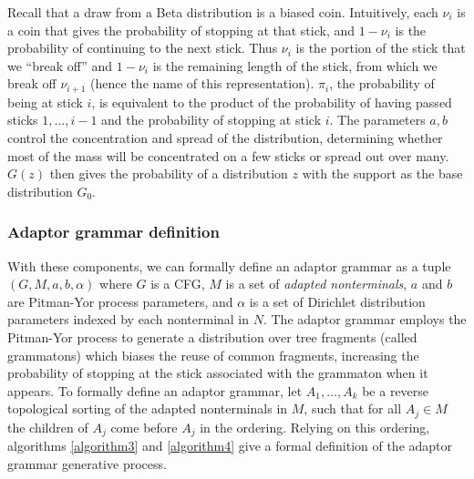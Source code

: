 \documentclass[12pt,letterpaper]{article}
\begin{document}
Recall that a draw from a Beta distribution is a biased coin. Intuitively, each $\nu_i$ is a coin that gives the probability of stopping at that stick, and $1-\nu_i$ is the probability of continuing to the next stick. Thus $\nu_i$ is the portion of the stick that we ``break off'' and $1-\nu_i$ is the remaining length of the stick, from which we break off $\nu_{i+1}$ (hence the name of this representation). $\pi_i$, the probability of being at stick $i$, is equivalent to the product of the probability of having passed sticks $1,...,i-1$ and the probability of stopping at stick $i$. The parameters $a,b$ control the concentration and spread of the distribution, determining whether most of the mass will be concentrated on a few sticks or spread out over many. $G(z)$ then gives the probability of a distribution $z$ with the support as the base distribution $G_0$. 

\subsubsection{Adaptor grammar definition}
With these components, we can formally define an adaptor grammar as a tuple $(G, M, a, b, \alpha)$ where $G$ is a CFG, $M$ is a set of \textit{adapted nonterminals}, $a$ and $b$ are Pitman-Yor process parameters, and $\alpha$ is a set of Dirichlet distribution parameters indexed by each nonterminal in $N$. The adaptor grammar employs the Pitman-Yor process to generate a distribution over tree fragments (called grammatons) which biases the reuse of common fragments, increasing the probability of stopping at the stick associated with the grammaton when it appears. To formally define an adaptor grammar, let $A_1,\ldots,A_k$ be a reverse topological sorting of the adapted nonterminals in $M$, such that for all $A_j \in M$ the children of $A_j$ come before $A_j$ in the ordering. Relying on this ordering, algorithms \hyperref[algorithm3]{\ref*{algorithm3}} and \hyperref[algorithm4]{\ref*{algorithm4}} give a formal definition of the adaptor grammar generative process.\\

\end{document}
